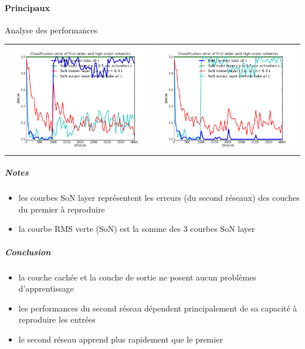     \paragraph{Principaux}
      Analyse des performances
      \begin{center}
	\begin{tabular}{lr}
	  \hspace*{-1cm}
	  \includegraphics[width=250px]{data/expB2/err.png}
	  &
	  \includegraphics[width=250px]{data/expB2/err_block.png} 
	\end{tabular}
      \end{center}
      \subparagraph{Notes}
	\begin{itemize}
	  \item les courbes SoN layer représentent les erreurs (du second réseaux) des couches du premier à reproduire 
	  \item la courbe RMS verte (SoN) est la somme des 3 courbes SoN layer
	\end{itemize}
      \subparagraph{Conclusion}
	\begin{itemize}
	  \item la couche cachée et la couche de sortie ne posent aucun problèmes d'apprentissage
	  \item les performances du second réseau dépendent principalement de sa capacité à reproduire les entrées
	  \item le second réseau apprend plus rapidement que le premier
	\end{itemize}
